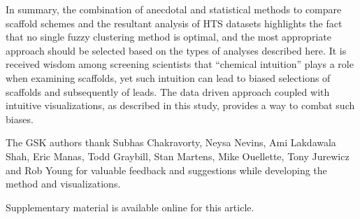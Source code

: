 \documentclass[journal=jacsat,manuscript=article]{achemso}
\begin{document}
In summary, the combination of anecdotal and statistical methods to
compare scaffold schemes and the resultant analysis of HTS datasets
highlights the fact that no single fuzzy clustering method is optimal,
and the most appropriate approach should be selected based on the
types of analyses described here. It is received wisdom among screening scientists 
that ``chemical intuition'' plays a role when examining scaffolds, yet such intuition
can lead to biased selections of scaffolds and subsequently of
leads. The data driven approach coupled with intuitive visualizations,
as described in this study, provides a way to combat such biases.


\begin{acknowledgement}
  The GSK authors thank Subhas Chakravorty, Neysa Nevins, Ami Lakdawala Shah,
  Eric Manas, Todd Graybill, Stan Martens, Mike Ouellette, Tony Jurewicz and Rob
  Young for valuable feedback and suggestions while developing the method and
  visualizations.
\end{acknowledgement}

\begin{suppinfo}
Supplementary material is available online for this article.
\end{suppinfo}


\end{document}
